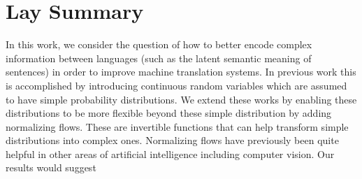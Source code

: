 

\chapter{Lay Summary}

In this work, we consider the question of how to better encode complex information between languages (such as the latent semantic meaning of sentences) in order to improve machine translation systems. In previous work this is accomplished by introducing continuous random variables which are assumed to have simple probability distributions. We extend these works by enabling these distributions to be more flexible beyond these simple distribution by adding normalizing flows. These are invertible functions that can help transform simple distributions into complex ones. Normalizing flows have previously been quite helpful in other areas of artificial intelligence including computer vision. Our results would suggest 

